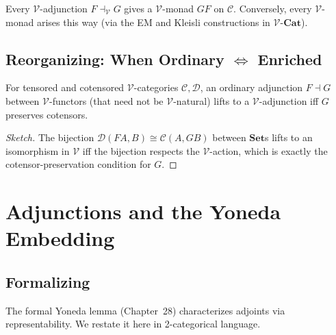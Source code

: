\begin{theorem}
\label{thm:v-adj-monad}
Every $\mathcal{V}$-adjunction $F \dashv_\mathcal{V} G$ gives a $\mathcal{V}$-monad
$GF$ on $\mathcal{C}$. Conversely, every $\mathcal{V}$-monad arises this way
(via the EM and Kleisli constructions in $\mathcal{V}$-$\mathbf{Cat}$).
\end{theorem}

\subsection{Reorganizing: When Ordinary $\Leftrightarrow$ Enriched}

\begin{theorem}
\label{thm:lift-adj}
For tensored and cotensored $\mathcal{V}$-categories $\mathcal{C}, \mathcal{D}$,
an ordinary adjunction $F \dashv G$ between $\mathcal{V}$-functors (that need
not be $\mathcal{V}$-natural) lifts to a $\mathcal{V}$-adjunction iff $G$
preserves cotensors.
\end{theorem}

\begin{proof}[Sketch]
The bijection $\mathcal{D}(FA, B) \cong \mathcal{C}(A, GB)$ between
$\mathbf{Set}$s lifts to an isomorphism in $\mathcal{V}$ iff the bijection
respects the $\mathcal{V}$-action, which is exactly the cotensor-preservation
condition for $G$.
\end{proof}


\section{Adjunctions and the Yoneda Embedding}
\label{sec:adj-via-yoneda}

\subsection{Formalizing}

The formal Yoneda lemma (Chapter~28) characterizes adjoints via representability.
We restate it here in 2-categorical language.

